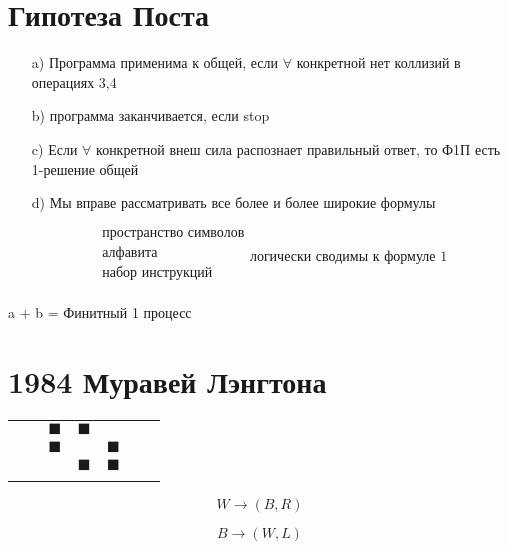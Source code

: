 \documentclass[a4paper, 14pt]{report}
\begin{document}
    \section{Гипотеза Поста}

    \begin{enumerate}
        \item[a)] Программа применима к общей, если $\forall$ конкретной нет коллизий в операциях 3,4
        \item[b)] программа заканчивается, если stop
        \item[c)] Если $\forall$ конкретной внеш сила распознает правильный ответ, то Ф1П есть 1-решение общей
        \item[d)] Мы вправе рассматривать все более и более широкие формулы

            $$
                \begin{array}{l}
                \text{пространство символов} \\
                \text{алфавита} \\
                \text{набор инструкций} \\
                \end{array}
            \text{логически сводимы к формуле 1}
            $$
    \end{enumerate}

    a + b = Финитный 1 процесс

    \section{1984 Муравей Лэнгтона}
    \begin{tabular}{c|c|c|c|c|c|c}
        & & & & & & \\
        \hline
        & & $\blacksquare$ & $\blacksquare$ & & & \\
        \hline
        & & $\blacksquare$ & & $\blacksquare$ & & \\
        \hline
        & & & $\blacksquare$ & $\blacksquare$ & & \\
        \hline
        & & & & & & \\
    \end{tabular}

    $$
    W \to (B,R)
    $$

    $$
    B \to (W,L)
    $$
\end{document}
